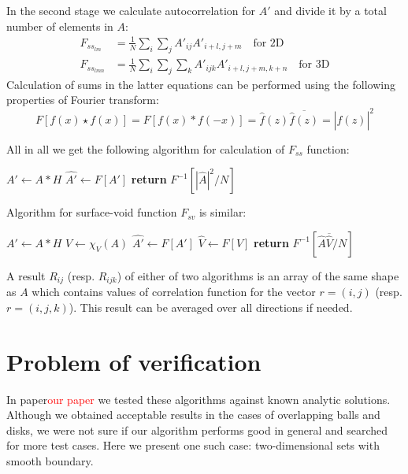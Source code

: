 \documentclass[reprint,amsmath,amssymb,aps,pre,showkeys,showpacs]{revtex4-1}
\begin{document}
In the second stage we calculate autocorrelation for $A'$ and divide it by a
total number of elements in $A$:
\begin{align*}
  F_{{ss}_{lm}} &= \frac{1}{N} \sum_i \sum_j A'_{ij}A'_{i+l, j+m} \quad
  \text{for 2D} \\
  F_{{ss}_{lmn}} &= \frac{1}{N} \sum_i \sum_j \sum_k A'_{ijk}A'_{i+l, j+m, k+n}
  \quad \text{for 3D}
\end{align*}
Calculation of sums in the latter equations can be performed using the following
properties of Fourier transform:
\begin{equation*}
  F[f(x) \star f(x)] = F[f(x) * f(-x)] = \hat{f}(z)\overline{\hat{f}(z)} = |\hat{f}(z)|^2
\end{equation*}

All in all we get the following algorithm for calculation of $F_{ss}$ function:
\begin{algorithmic}[1]
  \State $A' \gets A*H$
  \State $\hat{A'} \gets F[A']$
  \State \textbf{return} $F^{-1}[ |\hat{A}|^2 / N]$
  \EndProcedure
\end{algorithmic}

Algorithm for surface-void function $F_{sv}$ is similar:
\begin{algorithmic}[1]
  \State $A' \gets A*H$
  \State $V \gets \chi_V(A)$
  \State $\hat{A'} \gets F[A']$
  \State $\hat{V} \gets F[V]$
  \State \textbf{return} $F^{-1}[ \hat{A}\overline{\hat{V}} / N]$
  \EndProcedure
\end{algorithmic}

A result $R_{ij}$ (resp. $R_{ijk}$) of either of two algorithms is an array of
the same shape as $A$ which contains values of correlation function for the
vector $r = (i, j)$ (resp. $r = (i, j, k)$). This result can be averaged over
all directions if needed.

\section{Problem of verification}
\label{sec:verify}
In paper\textcolor{red}{our paper} we tested these algorithms against known
analytic solutions. Although we obtained acceptable results in the cases of
overlapping balls and disks, we were not sure if our algorithm performs good in
general and searched for more test cases. Here we present one such case:
two-dimensional sets with smooth boundary.
\end{document}
